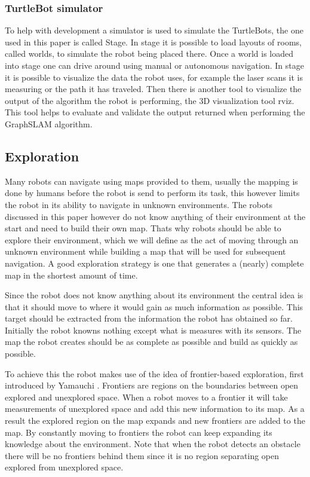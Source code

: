 \documentclass{ba-kecs}
\begin{document}
\subsubsection{TurtleBot simulator}
To help with development a simulator is used to simulate the TurtleBots, the one used in this paper is called Stage. In stage it is possible to load layouts of rooms, called worlds, to simulate the robot being placed there. Once a world is loaded into stage one can drive around using manual or autonomous navigation. In stage it is possible to visualize the data the robot uses, for example the laser scans it is measuring or the path it has traveled. Then there is another tool to visualize the output of the algorithm the robot is performing, the 3D visualization tool rviz. This tool helps to evaluate and validate the output returned when performing the GraphSLAM algorithm.

\subsection{Exploration}
Many robots can navigate using maps provided to them, usually the mapping is done by humans before the robot is send to perform its task, this however limits the robot in its ability to navigate in unknown environments. The robots discussed in this paper however do not know anything of their environment at the start and need to build their own map. Thats why robots should be able to explore their environment, which we will define as the act of moving through an unknown environment while building a map that will be used for subsequent navigation. A good exploration strategy is one that generates a (nearly) complete map in the shortest amount of time.

Since the robot does not know anything about its environment the central idea is that it should move to where it would gain as much information as possible. This target should be extracted from the information the robot has obtained so far. Initially the robot knowns nothing except what is measures with its sensors. The map the robot creates should be as complete as possible and build as quickly as possible.

To achieve this the robot makes use of the idea of frontier-based exploration, first introduced by Yamauchi \cite{Yamauchi}. Frontiers are regions on the boundaries between open explored and unexplored space. When a robot moves to a frontier it will take measurements of unexplored space and add this new information to its map. As a result the explored region on the map expands and new frontiers are added to the map. By constantly moving to frontiers the robot can keep expanding its knowledge about the environment. Note that when the robot detects an obstacle there will be no frontiers behind them since it is no region separating open explored from unexplored space.
\end{document}
